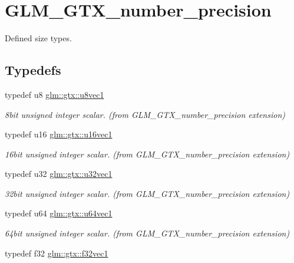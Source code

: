 \hypertarget{group__gtx__number__precision}{}\section{G\+L\+M\+\_\+\+G\+T\+X\+\_\+number\+\_\+precision}
\label{group__gtx__number__precision}


Defined size types.  


\subsection*{Typedefs}
\begin{DoxyCompactItemize}
\item 
typedef u8 \hyperlink{group__gtx__number__precision_ga35ae7849593a354420e4f52d1b36c2d6}{glm\+::gtx\+::u8vec1}
\begin{DoxyCompactList}\small\item\em 8bit unsigned integer scalar. (from G\+L\+M\+\_\+\+G\+T\+X\+\_\+number\+\_\+precision extension) \end{DoxyCompactList}\item 
typedef u16 \hyperlink{group__gtx__number__precision_ga807d7e5f24e981b1575bd40ca159781d}{glm\+::gtx\+::u16vec1}
\begin{DoxyCompactList}\small\item\em 16bit unsigned integer scalar. (from G\+L\+M\+\_\+\+G\+T\+X\+\_\+number\+\_\+precision extension) \end{DoxyCompactList}\item 
typedef u32 \hyperlink{group__gtx__number__precision_gac46a7890b20928df83e734c3ea9557d4}{glm\+::gtx\+::u32vec1}
\begin{DoxyCompactList}\small\item\em 32bit unsigned integer scalar. (from G\+L\+M\+\_\+\+G\+T\+X\+\_\+number\+\_\+precision extension) \end{DoxyCompactList}\item 
typedef u64 \hyperlink{group__gtx__number__precision_ga92812a1d7e746bcaba61d2f5a64afc52}{glm\+::gtx\+::u64vec1}
\begin{DoxyCompactList}\small\item\em 64bit unsigned integer scalar. (from G\+L\+M\+\_\+\+G\+T\+X\+\_\+number\+\_\+precision extension) \end{DoxyCompactList}\item 
typedef f32 \hyperlink{group__gtx__number__precision_gadab8e598b0b4697629482682bdb7f223}{glm\+::gtx\+::f32vec1}

\end{DoxyCompactItemize}
